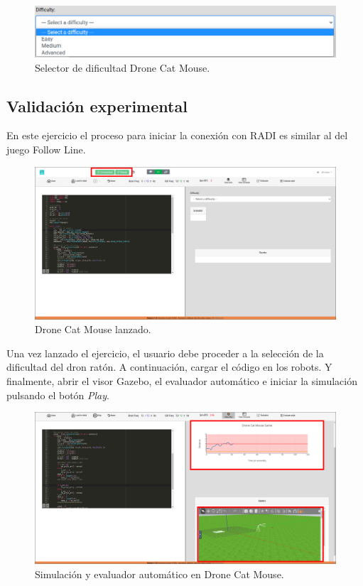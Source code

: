 \documentclass[a4paper, 12pt]{book}
\begin{document}
\begin{figure}[H]
	\centering
    \includegraphics[width=\textwidth]{img/drone_cat_mouse_difficulty.png}
    \caption{Selector de dificultad Drone Cat Mouse.}
    \label{figura:evaluator_drone}
\end{figure}

\subsection{Validación experimental}
En este ejercicio el proceso para iniciar la conexión con RADI es similar al del juego Follow Line. 

\begin{figure}[H]
	\centering
    \includegraphics[width=\textwidth]{img/dcm_conectado.png}
    \caption{Drone Cat Mouse lanzado.}
    \label{figura:evaluator_drone}
\end{figure}

Una vez lanzado el ejercicio, el usuario debe proceder a la selección de la dificultad del dron ratón. A continuación, cargar el código en los robots. Y finalmente, abrir el visor Gazebo, el evaluador automático e iniciar la simulación pulsando el botón \emph{Play}.

\begin{figure}[H]
	\centering
    \includegraphics[width=\textwidth]{img/dcm_sim.png}
    \caption{Simulación y evaluador automático en Drone Cat Mouse.}
\end{figure}
\end{document}
